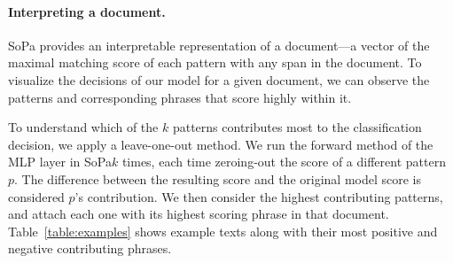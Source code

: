 \documentclass[11pt,a4paper]{article}
\newcommand{\SoftP}{SoPa\xspace}
\begin{document}
 \paragraph{Interpreting a document.}
\SoftP provides an interpretable representation of a document---a vector of the maximal matching score of each pattern with any span in the document.
To visualize the decisions of our model for a given document, we can observe the patterns and corresponding phrases that score highly within it.


To understand which of the $k$ patterns contributes most to the classification decision, we apply a leave-one-out method.
We run the forward method of the MLP layer in \SoftP $k$ times, each time zeroing-out the score of a different pattern $p$.
The difference between the resulting score and the original model score is considered $p$'s contribution.
We then consider the highest contributing patterns, and attach each one with its highest scoring phrase in that document.
Table~\ref{table:examples} shows example texts along with their most
positive and negative contributing phrases.

\newcommand{\positive}[1]{{\textcolor{DarkGreen}{\textbf{#1}}}}
\newcommand{\negative}[1]{{\textcolor{orange}{\textit{#1}}}}
\end{document}
